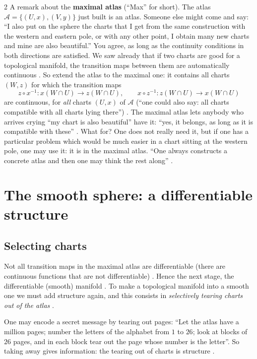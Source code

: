 \begin{paracol}{2}
A remark about the \textbf{maximal atlas} (``Max'' for short). The atlas $\mathcal A=\{(U,x),(V,y)\}$ just built is an atlas. Someone else
might come and say: ``I also put on the sphere the charts that I get from the same construction with the western and eastern pole, or with
any other point, I obtain many new charts and mine are also beautiful.'' You agree, as long as the continuity conditions in both directions
are satisfied. We saw already that if two charts are good for a topological manifold, the transition maps between them are automatically
continuous . So extend the atlas to the maximal one: it contains all charts $(W,z)$ for which the transition maps
\[
  z\circ x^{-1}\colon x(W\cap U)\to z(W\cap U),\qquad x\circ z^{-1}\colon z(W\cap U)\to x(W\cap U)
\]
are continuous, for \emph{all} charts $(U,x)$ of $\mathcal A$ (``one could also say: all charts compatible with all charts lying
there'') . The maximal atlas lets anybody who arrives crying ``my chart is also beautiful'' have it:
``yes, it belongs, as long as it is compatible with these'' .
What for? One does not really need it, but if one has a particular problem which would be much easier in a chart sitting at the
western pole, one may use it: it is in the maximal atlas. ``One always constructs a concrete atlas and then one may think the rest
along'' .

\section{The smooth sphere: a differentiable structure}\label{sec:sp-smooth}

\subsection{Selecting charts}

Not all transition maps in the maximal atlas are differentiable (there are continuous functions that are not differentiable) .
Hence the next stage, the differentiable (smooth) manifold . To make a topological manifold into a smooth one we
must add structure again, and this consists in \emph{selectively tearing charts out of the atlas} .
\begin{aside}
One may encode a secret message by tearing out pages: ``Let the atlas have a million pages; number the letters of the alphabet from
$1$ to $26$; look at blocks of $26$ pages, and in each block tear out the page whose number is the letter''. So taking away gives
information: the tearing out of charts is structure .
\end{aside}


\end{paracol}
